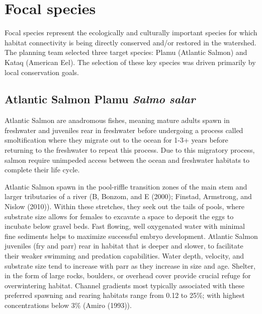 \documentclass[
  letterpaper,
  DIV=11,
  numbers=noendperiod]{scrreprt}
\begin{document}
\section*{Focal species}\label{focal-species}


Focal species represent the ecologically and culturally important
species for which habitat connectivity is being directly conserved
and/or restored in the watershed. The planning team selected three
target species: Plamu (Atlantic Salmon) and Kataq (American Eel). The
selection of these key species was driven primarily by local
conservation goals.

\subsection*{\texorpdfstring{Atlantic Salmon \textbar{} Plamu \textbar{}
\emph{Salmo
salar}}{Atlantic Salmon \textbar{} Plamu \textbar{} Salmo salar}}\label{atlantic-salmon-plamu-salmo-salar}

Atlantic Salmon are anadromous fishes, meaning mature adults spawn in
freshwater and juveniles rear in freshwater before undergoing a process
called smoltification where they migrate out to the ocean for 1-3+ years
before returning to the freshwater to repeat this process. Due to this
migratory process, salmon require unimpeded access between the ocean and
freshwater habitats to complete their life cycle.

Atlantic Salmon spawn in the pool-riffle transition zones of the main
stem and larger tributaries of a river (B, Bonzom, and E (2000);
Finstad, Armstrong, and Nislow (2010)). Within these stretches, they
seek out the tails of pools, where substrate size allows for females to
excavate a space to deposit the eggs to incubate below gravel beds. Fast
flowing, well oxygenated water with minimal fine sediments helps to
maximize successful embryo development. Atlantic Salmon juveniles (fry
and parr) rear in habitat that is deeper and slower, to facilitate their
weaker swimming and predation capabilities. Water depth, velocity, and
substrate size tend to increase with parr as they increase in size and
age. Shelter, in the form of large rocks, boulders, or overhead cover
provide crucial refuge for overwintering habitat. Channel gradients most
typically associated with these preferred spawning and rearing habitats
range from 0.12 to 25\%; with highest concentrations below 3\% (Amiro
(1993)).
\end{document}
